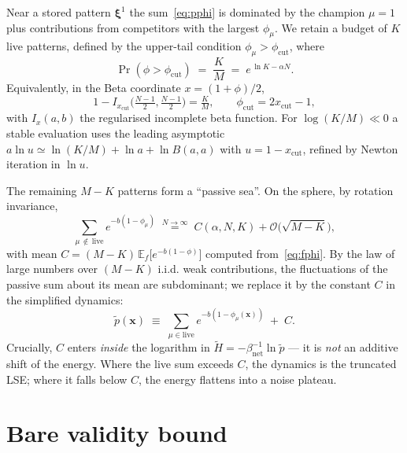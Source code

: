 \documentclass[11pt]{article}
\newcommand{\bxi}{\boldsymbol{\xi}}
\newcommand{\bx}{\mathbf{x}}
\newcommand{\Pcut}{\phi_{\mathrm{cut}}}
\begin{document}
Near a stored pattern $\bxi^1$ the sum~\eqref{eq:pphi} is dominated by the champion $\mu=1$ plus contributions from competitors with the largest $\phi_\mu$. We retain a budget of $K$ live patterns, defined by the upper-tail condition $\phi_\mu > \Pcut$, where
\begin{equation}
\boxed{\;\Pr(\phi > \Pcut) \;=\; \frac{K}{M} \;=\; e^{\,\ln K - \alpha N}.\;}
\label{eq:phicut}
\end{equation}
Equivalently, in the Beta coordinate $x = (1+\phi)/2$,
\begin{equation}
1 - I_{x_{\mathrm{cut}}}\!\Big(\tfrac{N-1}{2},\tfrac{N-1}{2}\Big) = \tfrac{K}{M},\qquad \Pcut = 2x_{\mathrm{cut}}-1,
\label{eq:phicut_beta}
\end{equation}
with $I_x(a,b)$ the regularised incomplete beta function. For $\log(K/M) \ll 0$ a stable evaluation uses the leading asymptotic $a\ln u \simeq \ln(K/M) + \ln a + \ln B(a,a)$ with $u = 1-x_{\mathrm{cut}}$, refined by Newton iteration in $\ln u$.

The remaining $M-K$ patterns form a ``passive sea''. On the sphere, by rotation invariance,
\begin{equation}
\sum_{\mu\,\notin\,\mathrm{live}} e^{-b(1-\phi_\mu)} \;\overset{N\to\infty}{=}\; C(\alpha,N,K) + \mathcal{O}\!\big(\sqrt{M-K}\big),
\label{eq:Cdef}
\end{equation}
with mean $C = (M-K)\,\mathbb{E}_f\!\big[e^{-b(1-\phi)}\big]$ computed from~\eqref{eq:fphi}. By the law of large numbers over $(M-K)$ i.i.d. weak contributions, the fluctuations of the passive sum about its mean are subdominant; we replace it by the constant $C$ in the simplified dynamics:
\begin{equation}
\tilde p(\bx) \;\equiv\; \sum_{\mu\in\mathrm{live}} e^{-b(1-\phi_\mu(\bx))} \;+\; C.
\label{eq:ptilde}
\end{equation}
Crucially, $C$ enters \emph{inside} the logarithm in $\tilde H = -\beta_{\mathrm{net}}^{-1}\ln\tilde p$ — it is \emph{not} an additive shift of the energy. Where the live sum exceeds $C$, the dynamics is the truncated LSE; where it falls below $C$, the energy flattens into a noise plateau.

\section{Bare validity bound}
\end{document}
